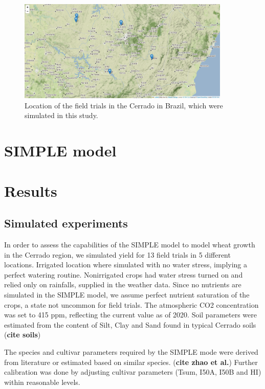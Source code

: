 \documentclass[11pt]{article}
\begin{document}
\begin{figure}[htbp]
\centering
\includegraphics[width=0.9\textwidth]{./figures/Brazil.png}
\caption{Location of the field trials in the Cerrado in Brazil, which were simulated in this study.}
\end{figure}


\section{SIMPLE model}
\label{sec:orgda55227}

\section{Results}
\label{sec:org94932b3}
\subsection{Simulated experiments}
\label{sec:orgf4297a6}
In order to assess the capabilities of the SIMPLE model to model wheat growth in the Cerrado region, we simulated yield for 13 field trials in 5 different locations. Irrigated location where simulated with no water stress, implying a perfect watering routine. Nonirrigated crops had water stress turned on and relied only on rainfalls, supplied in the weather data. Since no nutrients are simulated in the SIMPLE model, we assume perfect nutrient saturation of the crops, a state not uncommon for field trials. The atmospheric CO2 concentration was set to 415 ppm, reflecting the current value as of 2020. Soil parameters were estimated from the content of Silt, Clay and Sand found in typical Cerrado soils (\textbf{cite soils})

The species and cultivar parameters required by the SIMPLE mode were derived from literature or estimated based on similar species. (\textbf{cite zhao et al.}) Further calibration was done by adjusting cultivar parameters (Tsum, I50A, I50B and HI) within reasonable levels.
\end{document}
